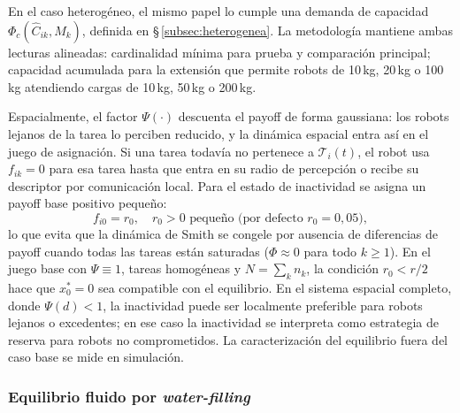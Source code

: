 En el caso heterogéneo, el mismo papel lo cumple una demanda de capacidad
$\Phi_c(\hat{C}_{ik},M_k)$, definida en \S\,\ref{subsec:heterogenea}. La metodología
mantiene ambas lecturas alineadas: cardinalidad mínima para prueba y comparación
principal; capacidad acumulada para la extensión que permite robots de 10\,kg, 20\,kg o
100\,kg atendiendo cargas de 10\,kg, 50\,kg o 200\,kg.

Espacialmente, el factor $\Psi(\cdot)$ descuenta el payoff de forma gaussiana: los
robots lejanos de la tarea lo perciben reducido, y la dinámica espacial entra así en el
juego de asignación. Si una tarea todavía no pertenece a $\mathcal{T}_i(t)$, el robot
usa $f_{ik}=0$ para esa tarea hasta que entra en su radio de percepción o recibe su
descriptor por comunicación local. Para el estado de inactividad se asigna un payoff base
positivo pequeño:
\begin{equation}
  f_{i0} = r_0, \quad r_0 > 0 \text{ pequeño (por defecto } r_0 = 0{,}05),
  \label{eq:payoff_idle}
\end{equation}
lo que evita que la dinámica de Smith se congele por ausencia de diferencias de
payoff cuando todas las tareas están saturadas ($\Phi \approx 0$ para todo $k \geq 1$).
En el juego base con $\Psi \equiv 1$, tareas homogéneas y $N = \sum_k n_k$, la
condición $r_0 < r/2$ hace que $x_0^* = 0$ sea compatible con el equilibrio. En el
sistema espacial completo, donde $\Psi(d) < 1$, la inactividad puede ser localmente
preferible para robots lejanos o excedentes; en ese caso la inactividad se interpreta
como estrategia de reserva para robots no comprometidos. La caracterización del
equilibrio fuera del caso base se mide en simulación.

\subsubsection{Equilibrio fluido por \emph{water-filling}}
\label{subsubsec:water_filling}

